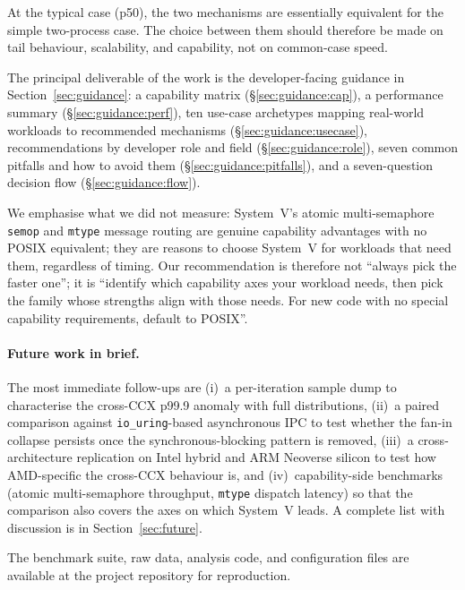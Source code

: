 \documentclass[a4paper,11pt]{article}
\begin{document}
At the typical case (p50), the two mechanisms are essentially
equivalent for the simple two-process case. The choice between them
should therefore be made on tail behaviour, scalability, and
capability, not on common-case speed.

The principal deliverable of the work is the developer-facing
guidance in Section~\ref{sec:guidance}: a capability matrix
(\S\ref{sec:guidance:cap}), a performance summary
(\S\ref{sec:guidance:perf}), ten use-case archetypes mapping
real-world workloads to recommended mechanisms
(\S\ref{sec:guidance:usecase}), recommendations by developer role
and field (\S\ref{sec:guidance:role}), seven common pitfalls and
how to avoid them (\S\ref{sec:guidance:pitfalls}), and a
seven-question decision flow (\S\ref{sec:guidance:flow}).

We emphasise what we did not measure: System~V's atomic
multi-semaphore \texttt{semop} and \texttt{mtype} message routing are
genuine capability advantages with no POSIX equivalent; they are
reasons to choose System~V for workloads that need them, regardless
of timing. Our recommendation is therefore not ``always pick the
faster one''; it is ``identify which capability axes your workload
needs, then pick the family whose strengths align with those needs.
For new code with no special capability requirements, default to
POSIX''.

\paragraph{Future work in brief.} The most immediate follow-ups are
(i)~a per-iteration sample dump to characterise the cross-CCX p99.9
anomaly with full distributions, (ii)~a paired comparison against
\texttt{io\_uring}-based asynchronous IPC to test whether the fan-in
collapse persists once the synchronous-blocking pattern is removed,
(iii)~a cross-architecture replication on Intel hybrid and ARM
Neoverse silicon to test how AMD-specific the cross-CCX behaviour
is, and (iv)~capability-side benchmarks (atomic multi-semaphore
throughput, \texttt{mtype} dispatch latency) so that the comparison
also covers the axes on which System~V leads. A complete list with
discussion is in Section~\ref{sec:future}.

\bigskip

\noindent The benchmark suite, raw data, analysis code, and
configuration files are available at the project repository for
reproduction.



\end{document}
